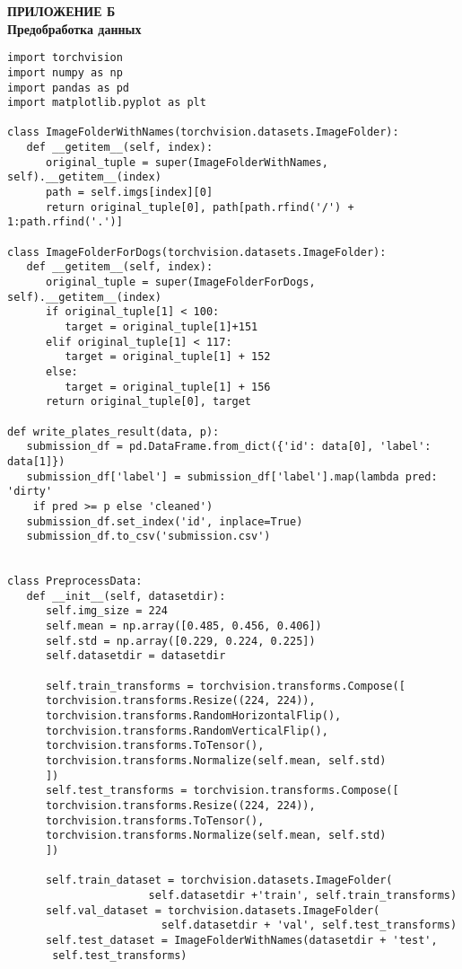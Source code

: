 \newpage
\normalsize
\begin{center}
	\textbf{ПРИЛОЖЕНИЕ Б\\ Предобработка данных}
\end{center}
\small
\begin{verbatim}
import torchvision
import numpy as np
import pandas as pd
import matplotlib.pyplot as plt

class ImageFolderWithNames(torchvision.datasets.ImageFolder):
   def __getitem__(self, index):
      original_tuple = super(ImageFolderWithNames, self).__getitem__(index)
      path = self.imgs[index][0]
      return original_tuple[0], path[path.rfind('/') + 1:path.rfind('.')]

class ImageFolderForDogs(torchvision.datasets.ImageFolder):
   def __getitem__(self, index):
      original_tuple = super(ImageFolderForDogs, self).__getitem__(index)
      if original_tuple[1] < 100:
         target = original_tuple[1]+151
      elif original_tuple[1] < 117:
         target = original_tuple[1] + 152
      else:
         target = original_tuple[1] + 156
      return original_tuple[0], target

def write_plates_result(data, p):
   submission_df = pd.DataFrame.from_dict({'id': data[0], 'label': data[1]})
   submission_df['label'] = submission_df['label'].map(lambda pred: 'dirty'
    if pred >= p else 'cleaned')
   submission_df.set_index('id', inplace=True)
   submission_df.to_csv('submission.csv')


class PreprocessData:
   def __init__(self, datasetdir):
      self.img_size = 224
      self.mean = np.array([0.485, 0.456, 0.406])
      self.std = np.array([0.229, 0.224, 0.225])
      self.datasetdir = datasetdir

      self.train_transforms = torchvision.transforms.Compose([
      torchvision.transforms.Resize((224, 224)),
      torchvision.transforms.RandomHorizontalFlip(),
      torchvision.transforms.RandomVerticalFlip(),
      torchvision.transforms.ToTensor(),
      torchvision.transforms.Normalize(self.mean, self.std)
      ])      
      self.test_transforms = torchvision.transforms.Compose([
      torchvision.transforms.Resize((224, 224)),
      torchvision.transforms.ToTensor(),
      torchvision.transforms.Normalize(self.mean, self.std)
      ])
      
      self.train_dataset = torchvision.datasets.ImageFolder(
                      self.datasetdir +'train', self.train_transforms)
      self.val_dataset = torchvision.datasets.ImageFolder(
                        self.datasetdir + 'val', self.test_transforms)
      self.test_dataset = ImageFolderWithNames(datasetdir + 'test',
       self.test_transforms)


\end{verbatim}
